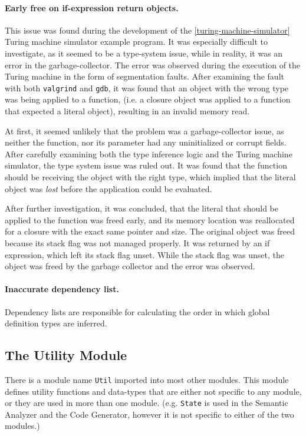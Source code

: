 \documentclass[12pt]{article}
\begin{document}
\paragraph{Early free on if-expression return objects.} This issue was found
during the development of the \ref{turing-machine-simulator} Turing machine
simulator example program. It was especially difficult to investigate, as it
seemed to be a type-system issue, while in reality, it was an error in the
garbage-collector. The error was observed during the execution of
the Turing machine in the form of segmentation faults. After examining the fault
with both \verb$valgrind$ and \verb$gdb$, it was found that an object with the
wrong type was being applied to a function, (i.e. a closure object was applied
to a function that expected a literal object), resulting in an invalid memory
read.

At first, it seemed unlikely that the problem was a garbage-collector issue, as
neither the function, nor its parameter had any uninitialized or corrupt fields.
After carefully examining both the type inference logic and the Turing machine
simulator, the type system issue was ruled out. It was found that the function
should be receiving the object with the right type, which implied that the
literal object was \emph{lost} before the application could be evaluated.

After further investigation, it was concluded, that the literal that should be
applied to the function was freed early, and its memory location was reallocated
for a closure with the exact same pointer and size. The original object was
freed because its stack flag was not managed properly. It was returned by an
if expression, which left its stack flag unset. While the stack flag was unset,
the object was freed by the garbage collector and the error was observed.

\paragraph{Inaccurate dependency list.} Dependency lists are responsible for
calculating the order in which global definition types are inferred.

\subsection{The Utility Module}

There is a module name \verb$Util$ imported into most other modules. This module
defines utility functions and data-types that are either not specific to any
module, or they are used in more than one module. (e.g. \verb$State$ is used in
the Semantic Analyzer and the Code Generator, however it is not specific to
either of the two modules.)



\end{document}
